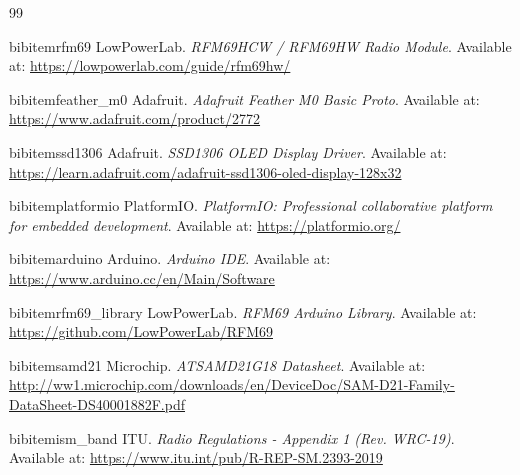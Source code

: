 

\begin{thebibliography}{99}

bibitem{rfm69}
LowPowerLab. \textit{RFM69HCW / RFM69HW Radio Module}. 
Available at: \url{https://lowpowerlab.com/guide/rfm69hw/}

bibitem{feather_m0}
Adafruit. \textit{Adafruit Feather M0 Basic Proto}.
Available at: \url{https://www.adafruit.com/product/2772}

bibitem{ssd1306}
Adafruit. \textit{SSD1306 OLED Display Driver}.
Available at: \url{https://learn.adafruit.com/adafruit-ssd1306-oled-display-128x32}

bibitem{platformio}
PlatformIO. \textit{PlatformIO: Professional collaborative platform for embedded development}.
Available at: \url{https://platformio.org/}

bibitem{arduino}
Arduino. \textit{Arduino IDE}.
Available at: \url{https://www.arduino.cc/en/Main/Software}

bibitem{rfm69_library}
LowPowerLab. \textit{RFM69 Arduino Library}.
Available at: \url{https://github.com/LowPowerLab/RFM69}

bibitem{samd21}
Microchip. \textit{ATSAMD21G18 Datasheet}.
Available at: \url{http://ww1.microchip.com/downloads/en/DeviceDoc/SAM-D21-Family-DataSheet-DS40001882F.pdf}

bibitem{ism_band}
ITU. \textit{Radio Regulations - Appendix 1 (Rev. WRC-19)}.
Available at: \url{https://www.itu.int/pub/R-REP-SM.2393-2019}

\end{thebibliography}
